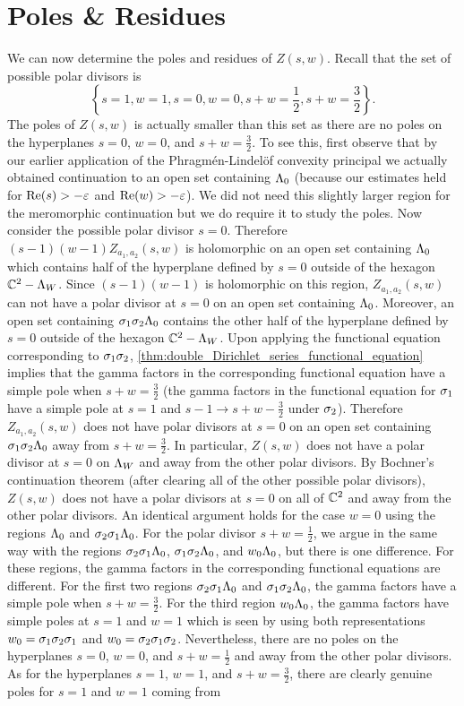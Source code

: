 \documentclass[12pt,reqno,oneside]{amsart}
\begin{document}
\section{Poles \& Residues}
    We can now determine the poles and residues of $Z(s,w)$. Recall that the set of possible polar divisors is
    \[
        \left\{s = 1, w = 1, s = 0, w = 0, s+w = \frac{1}{2}, s+w = \frac{3}{2}\right\}.
    \]
    The poles of $Z(s,w)$ is actually smaller than this set as there are no poles on the hyperplanes $s = 0$, $w = 0$, and $s+w = \frac{3}{2}$. To see this, first observe that by our earlier application of the Phragm\'en-Lindel\"of convexity principal we actually obtained continuation to an open set containing $\Lambda_{0}$ (because our estimates held for $\mathrm{Re}(s) > -\varepsilon$ and $\mathrm{Re}(w) > -\varepsilon$). We did not need this slightly larger region for the meromorphic continuation but we do require it to study the poles. Now consider the possible polar divisor $s = 0$. Therefore $(s-1)(w-1)Z_{a_{1},a_{2}}(s,w)$ is holomorphic on an open set containing $\Lambda_{0}$ which contains half of the hyperplane defined by $s = 0$ outside of the hexagon $\mathbb{C}^{2}-\Lambda_{W}$. Since $(s-1)(w-1)$ is holomorphic on this region, $Z_{a_{1},a_{2}}(s,w)$ can not have a polar divisor at $s = 0$ on an open set containing $\Lambda_{0}$. Moreover, an open set containing $\sigma_{1}\sigma_{2}\Lambda_{0}$ contains the other half of the hyperplane defined by $s = 0$ outside of the hexagon $\mathbb{C}^{2}-\Lambda_{W}$. Upon applying the functional equation corresponding to $\sigma_{1}\sigma_{2}$, \cref{thm:double_Dirichlet_series_functional_equation} implies that the gamma factors in the corresponding functional equation have a simple pole when $s+w = \frac{3}{2}$ (the gamma factors in the functional equation for $\sigma_{1}$ have a simple pole at $s = 1$ and $s-1 \to s+w-\frac{3}{2}$ under $\sigma_{2}$). Therefore $Z_{a_{1},a_{2}}(s,w)$ does not have polar divisors at $s = 0$ on an open set containing $\sigma_{1}\sigma_{2}\Lambda_{0}$ away from $s+w = \frac{3}{2}$. In particular, $Z(s,w)$ does not have a polar divisor at $s = 0$ on $\Lambda_{W}$ and away from the other polar divisors. By Bochner's continuation theorem (after clearing all of the other possible polar divisors), $Z(s,w)$ does not have a polar divisors at $s = 0$ on all of $\mathbb{C}^{2}$ and away from the other polar divisors. An identical argument holds for the case $w = 0$ using the regions $\Lambda_{0}$ and $\sigma_{2}\sigma_{1}\Lambda_{0}$. For the polar divisor $s+w = \frac{1}{2}$, we argue in the same way with the regions $\sigma_{2}\sigma_{1}\Lambda_{0}$, $\sigma_{1}\sigma_{2}\Lambda_{0}$, and $w_{0}\Lambda_{0}$, but there is one difference. For these regions, the gamma factors in the corresponding functional equations are different. For the first two regions $\sigma_{2}\sigma_{1}\Lambda_{0}$ and $\sigma_{1}\sigma_{2}\Lambda_{0}$, the gamma factors have a simple pole when $s+w = \frac{3}{2}$. For the third region $w_{0}\Lambda_{0}$, the gamma factors have simple poles at $s = 1$ and $w = 1$ which is seen by using both representations $w_{0} = \sigma_{1}\sigma_{2}\sigma_{1}$ and $w_{0} = \sigma_{2}\sigma_{1}\sigma_{2}$. Nevertheless, there are no poles on the hyperplanes $s = 0$, $w = 0$, and $s+w = \frac{1}{2}$ and away from the other polar divisors. As for the hyperplanes $s = 1$, $w = 1$, and $s+w = \frac{3}{2}$, there are clearly genuine poles for $s = 1$ and $w = 1$ coming from 
\end{document}
